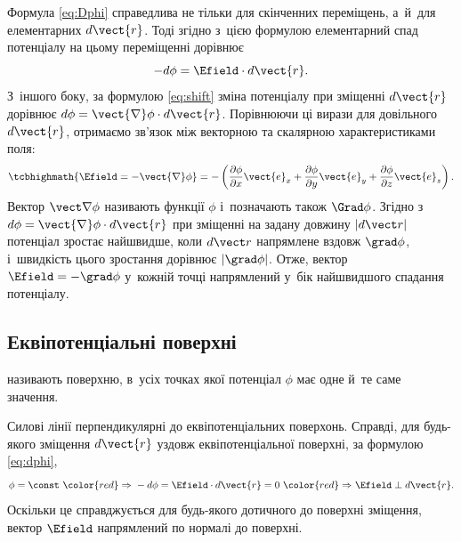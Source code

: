 Формула \eqref{eq:Dphi} справедлива не тільки для скінченних переміщень, а~й~для
елементарних $d\vect{r}$. Тоді згідно з~цією формулою елементарний спад потенціалу на
цьому переміщенні дорівнює
\begin{equation}\label{eq:dphi}
	-d\phi = \Efield\cdot d\vect{r}.
\end{equation}
З~іншого боку, за формулою \eqref{eq:shift} зміна потенціалу при зміщенні $d\vect{r}$
дорівнює $d\phi = \vect{\nabla}\phi\cdot d\vect{r}$. Порівнюючи ці вирази для довільного
$d\vect{r}$, отримаємо зв'язок між векторною та скалярною характеристиками поля:
\begin{equation}\label{eq:E=-Dphi}
	\tcbhighmath{\Efield = - \vect{\nabla}\phi }= - \left( \frac{\partial
		\phi}{\partial x}
	\vect{e}_x + \frac{\partial \phi}{\partial y} \vect{e}_y + \frac{\partial
		\phi}{\partial z} \vect{e}_z\right).
\end{equation}
Вектор $\vect\nabla\phi$ називають  функції $\phi$ і~позначають
також $\Grad\phi$. Згідно з~$d\phi = \vect{\nabla}\phi\cdot d\vect{r}$ при зміщенні на
задану довжину $|d\vect r|$ потенціал зростає найшвидше, коли $d\vect r$ напрямлене
вздовж $\grad\phi$, і~швидкість цього зростання дорівнює $|\grad\phi|$. Отже, вектор
$\Efield = -\grad\phi$ у~кожній точці напрямлений у~бік найшвидшого спадання потенціалу.



\subsection*{Еквіпотенціальні поверхні}



 називають поверхню, в~усіх точках якої
потенціал $\phi$ має одне й~те саме значення.

Силові лінії перпендикулярні до еквіпотенціальних поверхонь. Справді, для будь-якого
зміщення $d\vect{r}$ уздовж еквіпотенціальної поверхні, за формулою \eqref{eq:dphi},
\begin{equation*}
	\phi = \const\ {\color{red}\Rightarrow}\
	-d\phi = \Efield\cdot d\vect{r} = 0\ {\color{red}\Rightarrow}\
	\Efield \perp d\vect{r}.
\end{equation*}
Оскільки це справджується для будь-якого дотичного до поверхні зміщення, вектор $\Efield$
напрямлений по нормалі до поверхні.

